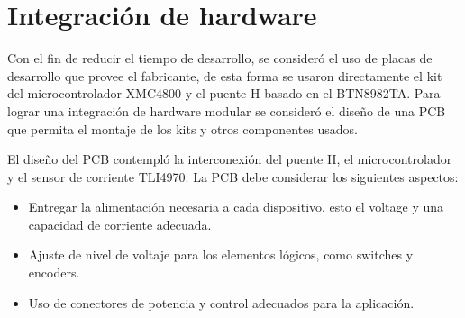 \section{Integración de hardware}

Con el fin de reducir el tiempo de desarrollo, se consideró el uso de placas de desarrollo que provee el fabricante, de esta forma se usaron directamente el kit del microcontrolador XMC4800 y el puente H basado en el BTN8982TA. Para lograr una integración de hardware modular se consideró  el diseño de una PCB que permita el montaje de los kits y otros componentes usados.

El diseño del PCB contempló la interconexión del puente H, el microcontrolador y el sensor de corriente TLI4970. La PCB debe considerar los siguientes aspectos:
\begin{itemize}
\item Entregar la alimentación necesaria a cada dispositivo, esto el voltage y una capacidad de corriente adecuada.
\item Ajuste de nivel de voltaje para los elementos lógicos, como switches y encoders.
\item Uso de conectores de potencia y control adecuados para la aplicación.
\end{itemize}



